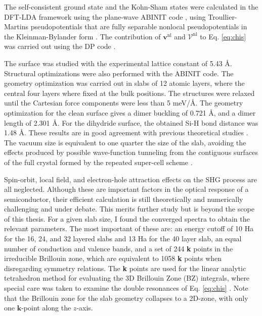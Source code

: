 The self-consistent ground state and the Kohn-Sham states were calculated in the
DFT-LDA framework using the plane-wave ABINIT code \cite{gonzeCPS09, abinit},
using Troullier-Martins pseudopotentials \cite{troullierPRB91} that are fully
separable nonlocal pseudopotentials in the Kleinman-Bylander form
\cite{kleinmanPRL82}. The contribution of $\mathbf{v}^\mathrm{nl}$ and
$\boldsymbol{\mathcal{V}}^\mathrm{nl}$ to Eq. \eqref{eq:chis} was carried out
using the DP code \cite{olevanoDP}.

The surface was studied with the experimental lattice constant of 5.43 \AA.
Structural optimizations were also performed with the ABINIT code. The geometry
optimization was carried out in slabs of 12 atomic layers, where the central
four layers where fixed at the bulk positions. The structures were relaxed until
the Cartesian force components were less than 5 meV/\AA. The geometry
optimization for the clean surface gives a dimer buckling of 0.721 \AA, and a
dimer length of 2.301 \AA. For the dihydride surface, the obtained Si-H bond
distance was 1.48 \AA. These results are in good agreement with previous
theoretical studies \cite{caramellaPRB09, mendozaPRB06}. The vacuum size is
equivalent to one quarter the size of the slab, avoiding the effects produced by
possible wave-function tunneling from the contiguous surfaces of the full
crystal formed by the repeated super-cell scheme \cite{mendozaPRB06}.

Spin-orbit, local field, and electron-hole attraction \cite{beyond} effects on
the SHG process are all neglected. Although these are important factors in the
optical response of a semiconductor, their efficient calculation is still
theoretically and numerically challenging and under debate. This merits further
study but is beyond the scope of this thesis. For a given slab size, I found the
converged spectra to obtain the relevant parameters. The most important of these
are: an energy cutoff of 10 Ha for the 16, 24, and 32 layered slabs and 13 Ha
for the 40 layer slab, an equal number of conduction and valence bands, and a
set of 244 \textbf{k} points in the irreducible Brillouin zone, which are
equivalent to 1058 \textbf{k} points when disregarding symmetry relations. The
\textbf{k} points are used for the linear analytic tetrahedron method for
evaluating the 3D Brillouin Zone (BZ) integrals, where special care was taken to
examine the double resonances of Eq. \eqref{eq:chis} \cite{nastosPRB05}. Note
that the Brillouin zone for the slab geometry collapses to a 2D-zone, with only
one $\mathbf{k}$-point along the $z$-axis.

